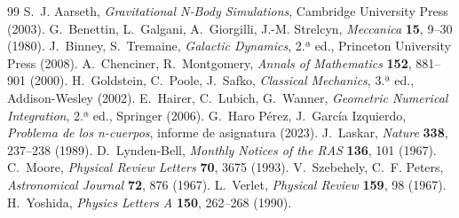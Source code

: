 \documentclass[11pt,a4paper]{article}
\begin{document}
\begin{thebibliography}{99}
\small
{} S.~J. Aarseth, \emph{Gravitational N-Body Simulations}, Cambridge University Press (2003).
 G.~Benettin, L.~Galgani, A.~Giorgilli, J.-M. Strelcyn, \emph{Meccanica} \textbf{15}, 9--30 (1980).
 J.~Binney, S.~Tremaine, \emph{Galactic Dynamics}, 2.ª ed., Princeton University Press (2008).
 A.~Chenciner, R.~Montgomery, \emph{Annals of Mathematics} \textbf{152}, 881--901 (2000).
 H.~Goldstein, C.~Poole, J.~Safko, \emph{Classical Mechanics}, 3.ª ed., Addison-Wesley (2002).
 E.~Hairer, C.~Lubich, G.~Wanner, \emph{Geometric Numerical Integration}, 2.ª ed., Springer (2006).
 G.~Haro Pérez, J.~García Izquierdo, \emph{Problema de los n-cuerpos}, informe de asignatura (2023).
 J.~Laskar, \emph{Nature} \textbf{338}, 237--238 (1989).
 D.~Lynden-Bell, \emph{Monthly Notices of the RAS} \textbf{136}, 101 (1967).
 C.~Moore, \emph{Physical Review Letters} \textbf{70}, 3675 (1993).
 V.~Szebehely, C.~F. Peters, \emph{Astronomical Journal} \textbf{72}, 876 (1967).
 L.~Verlet, \emph{Physical Review} \textbf{159}, 98 (1967).
 H.~Yoshida, \emph{Physics Letters A} \textbf{150}, 262--268 (1990).
\end{thebibliography}
\end{document}
